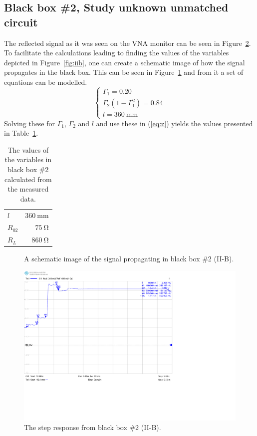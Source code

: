 \documentclass[12pt,a4paper]{article}
\begin{document}
\subsection{Black box \#2, Study unknown unmatched circuit}
The reflected signal as it was seen on the VNA monitor can be seen in Figure~\ref{fig:response}. To facilitate the calculations leading to finding the values of the variables depicted in Figure~\ref{fig:iib}, one can create a schematic image of how the signal propagates in the black box. This can be seen in Figure~\ref{fig:iibrefl} and from it a set of equations can be modelled.
\begin{equation}
  \begin{cases}
    \Gamma_{1}=0.20 \\
    \Gamma_{2}(1-\Gamma_{1}^{2})=0.84 \\
    l=\SI{360}{\milli\metre}
  \end{cases}
\end{equation}
Solving these for $\Gamma_{1}$, $\Gamma_{2}$ and $l$ and use these in (\ref{eq:z}) yields the values presented in Table~\ref{tab:box2_res}.
\begin{table}[ht]
  \centering
  \caption{The values of the variables in black box \#2 calculated from the measured data.}
  \begin{tabular}{|l|r|}\hline
    $l$ & $\SI{360}{\milli\metre}$ \\
    $R_{02}$ & $\SI{75}{\ohm}$ \\
    $R_{L}$ & $\SI{860}{\ohm}$ \\ \hline
  \end{tabular}
  \label{tab:box2_res}
\end{table}

\begin{figure}[ht]
  \centering
  
  \caption{\label{fig:iibrefl} A schematic image of the signal propagating in black box \#2 (II-B).}
\end{figure}

\begin{figure}[ht]
  \centering
  \includegraphics[width=\textwidth]{Han_Marcus_II-B.pdf}
  \caption{\label{fig:response} The step response from black box \#2 (II-B).}
\end{figure}
\end{document}
